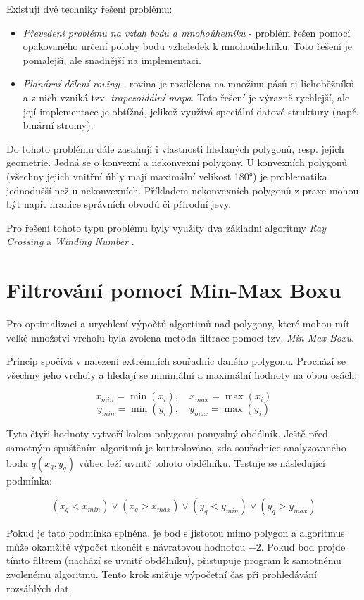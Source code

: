 \documentclass[12pt, a4paper]{article}
\begin{document}
Existují dvě techniky řešení problému:
\begin{itemize}
  \item \textit{Převedení problému na vztah bodu a mnohoúhelníku} - problém řešen pomocí opakovaného určení polohy bodu vzheledek k mnohoúhelníku. Toto řešení je pomalejší, ale snadnější na implementaci.
  \item \textit{Planární dělení roviny} - rovina je rozdělena na množinu pásů ci lichoběžníků a z nich vzniká tzv. \textit{trapezoidální mapa}. Toto řešení je výrazně rychlejší, ale její implementace je obtížná, jelikož využívá speciální datové struktury (např. binární stromy).
\end{itemize}

Do tohoto problému dále zasahují i vlastnosti hledaných polygonů, resp. jejich geometrie. Jedná se o konvexní a nekonvexní polygony. U konvexních polygonů (všechny jejich vnitřní úhly mají maximální velikost 180°) je problematika jednodušší než u nekonvexních. Příkladem nekonvexních polygonů z praxe mohou být např. hranice správních obvodů či přírodní jevy.


Pro řešení tohoto typu problému byly využity dva základní algoritmy \textit{Ray Crossing} a \textit{Winding Number} \parencite{bayer}.

\section{Filtrování pomocí Min-Max Boxu}
Pro optimalizaci a urychlení výpočtů algortimů nad polygony, které mohou mít velké množství vrcholu byla zvolena metoda filtrace pomocí tzv. \textit{Min-Max Boxu}. 

Princip spočívá v nalezení extrémních souřadnic daného polygonu. Prochází se všechny jeho vrcholy a hledají se minimální a maximální hodnoty na obou osách:

$$ x_{min} = \min(x_i), \quad x_{max} = \max(x_i) $$
$$ y_{min} = \min(y_i), \quad y_{max} = \max(y_i) $$

Tyto čtyři hodnoty vytvoří kolem polygonu pomyslný obdélník. Ještě před samotným spuštěním algoritmů je kontrolováno, zda souřadnice analyzovaného bodu $q(x_q, y_q)$ vůbec leží uvnitř tohoto obdélníku. Testuje se následující podmínka:

$$ (x_q < x_{min}) \lor (x_q > x_{max}) \lor (y_q < y_{min}) \lor (y_q > y_{max}) $$

Pokud je tato podmínka splněna, je bod s jistotou mimo polygon a algoritmus může okamžitě výpočet ukončit s návratovou hodnotou $-2$. Pokud bod projde tímto filtrem (nachází se uvnitř obdélníku), přistupuje program k samotnému zvolenému algoritmu. Tento krok snižuje výpočetní čas při prohledávání rozsáhlých dat.
\end{document}

